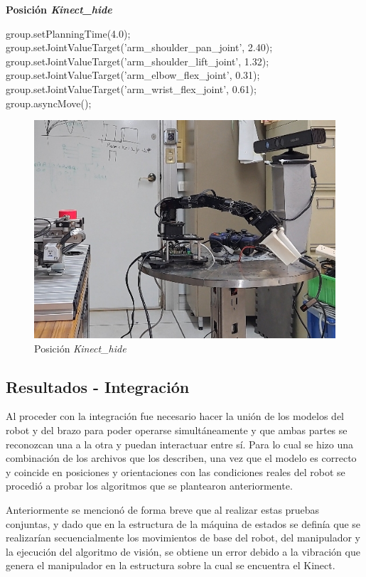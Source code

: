 \textbf{Posición \textit{Kinect\_hide}}
\begin{center}
        group.setPlanningTime(4.0);\\
        group.setJointValueTarget('arm\_shoulder\_pan\_joint', 2.40);\\
        group.setJointValueTarget('arm\_shoulder\_lift\_joint', 1.32);\\
        group.setJointValueTarget('arm\_elbow\_flex\_joint', 0.31);\\
        group.setJointValueTarget('arm\_wrist\_flex\_joint', 0.61);\\
        group.asyncMove();\\
\end{center}
        

\begin{figure}[ht]
    \centering
    \includegraphics[scale=0.5]{Figures/Kinect_hide.png}
        \caption{Posición \textit{Kinect\_hide}}
        \label{fig:Kinect_hide}
\end{figure}

\subsection{Resultados - Integración}
Al proceder con la integración fue necesario hacer la unión de los modelos del robot y del brazo para poder operarse simultáneamente y que ambas partes se reconozcan una a la otra y puedan interactuar entre sí. Para lo cual se hizo una combinación de los archivos que los describen, una vez que el modelo es correcto y coincide en posiciones y orientaciones con las condiciones reales del robot se procedió a probar los algoritmos que se plantearon anteriormente. 

Anteriormente se mencionó de forma breve que al realizar estas pruebas conjuntas, y dado que en la estructura de la máquina de estados se definía que se realizarían secuencialmente los movimientos de base del robot, del manipulador y la ejecución del algoritmo de visión, se obtiene un error debido a la vibración que genera el manipulador en la estructura sobre la cual se encuentra el Kinect. 





